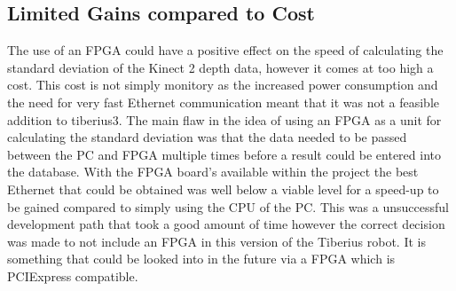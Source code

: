 \subsection{Limited Gains compared to Cost}
The use of an \gls{FPGA} could have a positive effect on the speed of calculating the standard deviation of the Kinect 2 depth data, however it comes at too high a cost. This cost is not simply monitory as the increased power consumption and the need for very fast Ethernet communication meant that it was not a feasible addition to \gls{tiberius3}. The main flaw in the idea of using an \gls{FPGA} as a unit for calculating the standard deviation was that the data needed to be passed between the PC and \gls{FPGA} multiple times before a result could be entered into the database. With the \gls{FPGA} board's available within the project the best Ethernet that could be obtained was well below a viable level for a speed-up to be gained compared to simply using the CPU of the PC. This was a unsuccessful development path that took a good amount of time however the correct decision was made to not include an \gls{FPGA} in this version of the Tiberius robot. It is something that could be looked into in the future via a FPGA which is PCIExpress compatible.

\pagestyle{stuart}













